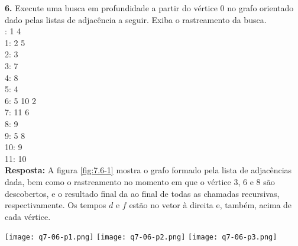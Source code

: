 

\noindent\textbf{6.} Execute uma busca em profundidade a partir do vértice 0 no grafo orientado dado pelas listas de adjacência a seguir. Exiba o rastreamento da busca.\\[6pt]
: 1 4\\
1: 2 5\\
2: 3\\
3: 7\\
4: 8\\
5: 4\\
6: 5 10 2\\
7: 11 6\\
8: 9\\
9: 5 8\\
10: 9\\
11: 10\\

\textbf{Resposta:} A figura \ref{fig:7.6-1} mostra o grafo formado pela lista de adjacências dada, bem como o rastreamento no momento em que o vértice 3, 6 e 8 são descobertos, e o resultado final da  ao final de todas as chamadas recursivas, respectivamente. Os tempos $d$ e $f$ estão no vetor à direita e, também, acima de cada vértice.

\begin{center}
\texttt{[image: q7-06-p1.png]}
\texttt{[image: q7-06-p2.png]}
\texttt{[image: q7-06-p3.png]}
\label{fig:7.6-1}
\end{center}